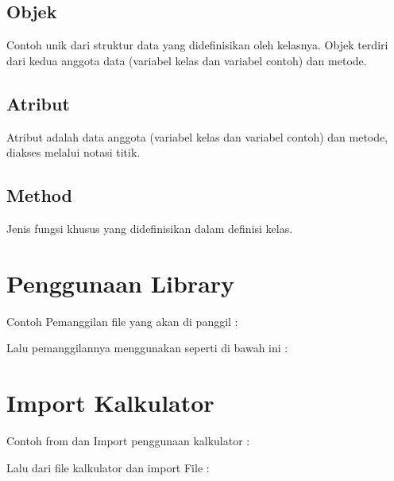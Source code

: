 \documentclass[12pt, times new roman]{report}
\begin{document}
    
    
    \subsection{Objek}
    \hspace{1cm}Contoh unik dari struktur data yang didefinisikan oleh kelasnya. Objek terdiri dari kedua anggota data (variabel kelas dan variabel contoh) dan metode.
    
    
    
    \subsection{Atribut}
    \hspace{1cm}Atribut adalah data anggota (variabel kelas dan variabel contoh) dan metode, diakses melalui notasi titik.
    
    
    
    \subsection{Method}
    \hspace{1cm}Jenis fungsi khusus yang didefinisikan dalam definisi kelas.
    
    
    
\section{Penggunaan Library}
\hspace{1cm}Contoh Pemanggilan file yang akan di panggil :


\hspace{1cm}Lalu pemanggilannya menggunakan seperti di bawah ini :



\section{Import Kalkulator}
\hspace{1cm}Contoh from dan Import penggunaan kalkulator :


\hspace{1cm}Lalu dari file kalkulator dan import File :
\end{document}
